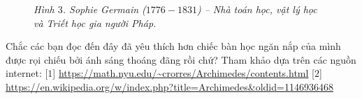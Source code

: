 \begin{multicols}{2}
\begin{figure}[H]
		\caption{\small\textit{\color{quantoan}Hình $3$. Sophie Germain ($1776-1831$) -- Nhà toán học, vật lý học và Triết học gia người Pháp.}}
		\vspace*{-10pt}
	\end{figure}
	Chắc các bạn đọc đến đây đã yêu thích hơn chiếc bàn học ngăn nắp của mình được rọi chiếu bởi ánh sáng thoáng đãng rồi chứ?
	\vskip 0.1cm
	Tham khảo dựa trên các nguồn internet:
	\vskip 0.1cm
	[$1$]	\url{https://math.nyu.edu/~crorres/Archimedes/contents.html}
	\vskip 0.1cm
	[$2$]	\url{https://en.wikipedia.org/w/index.php?title=Archimedes&oldid=1146936468}
	
	
\end{multicols}